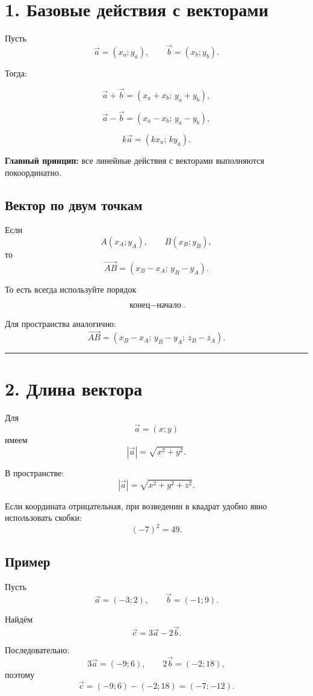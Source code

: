 \documentclass[a4paper,12pt]{article}
\newcommand{\vect}[1]{\overrightarrow{#1}}
\newcommand{\vct}[1]{\vec{#1}}
\newcommand{\sectionline}{%
    \par\noindent
    {\color{linegray}\rule{\linewidth}{0.5pt}}
    \par
}
\begin{document}
\section*{\color{darkaccent}1. Базовые действия с векторами}

Пусть
\[
\vct a=(x_a;y_a),
\qquad
\vct b=(x_b;y_b).
\]

Тогда:

\[
\vct a+\vct b=(x_a+x_b;\,y_a+y_b),
\]

\[
\vct a-\vct b=(x_a-x_b;\,y_a-y_b),
\]

\[
k\vct a=(kx_a;\,ky_a).
\]

\textbf{Главный принцип:} все линейные действия с векторами выполняются
покоординатно.

\subsection*{\color{accent}Вектор по двум точкам}

Если
\[
A(x_A;y_A),
\qquad
B(x_B;y_B),
\]
то
\[
\boxed{\vect{AB}=(x_B-x_A;\,y_B-y_A)}.
\]

То есть всегда используйте порядок

\[
\boxed{\text{конец} - \text{начало}}.
\]

Для пространства аналогично:
\[
\vect{AB}
=
(x_B-x_A;\,y_B-y_A;\,z_B-z_A).
\]

\sectionline

\section*{\color{darkaccent}2. Длина вектора}

Для
\[
\vct a=(x;y)
\]
имеем
\[
\boxed{|\vct a|=\sqrt{x^2+y^2}}.
\]

В пространстве:
\[
\boxed{|\vct a|=\sqrt{x^2+y^2+z^2}}.
\]

Если координата отрицательная, при возведении в квадрат удобно
явно использовать скобки:
\[
(-7)^2=49.
\]

\subsection*{\color{accent}Пример}

Пусть
\[
\vct a=(-3;2),
\qquad
\vct b=(-1;9).
\]

Найдём
\[
\vct c=3\vct a-2\vct b.
\]

Последовательно:
\[
3\vct a=(-9;6),
\qquad
2\vct b=(-2;18),
\]
поэтому
\[
\vct c=(-9;6)-(-2;18)=(-7;-12).
\]
\end{document}
